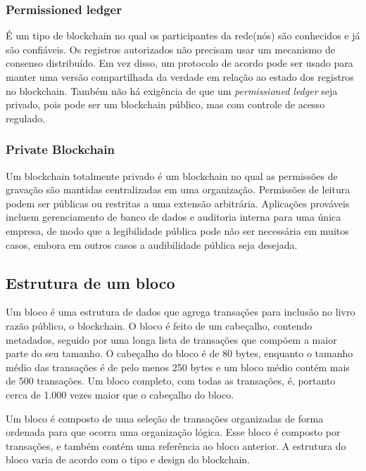     \subsubsection{Permissioned ledger}
    
    É um tipo de blockchain no qual os participantes da rede(nós) são conhecidos e já são confiáveis. Os registros autorizados não precisam usar um mecanismo de consenso distribuído. Em vez disso, um protocolo de acordo pode ser usado para manter uma versão compartilhada da verdade em relação ao estado dos registros no blockchain. Também não há exigência de que um \textit{permissioned ledger} seja privado, pois pode ser um blockchain público, mas com controle de acesso regulado.\cite{mastering_blockchain}

    \subsubsection{Private Blockchain}

    Um blockchain totalmente privado é um blockchain no qual as permissões de gravação são mantidas centralizadas em uma organização. Permissões de leitura podem ser públicas ou restritas a uma extensão arbitrária. Aplicações prováveis incluem gerenciamento de banco de dados e auditoria interna para uma única empresa, de modo que a legibilidade pública pode não ser necessária em muitos casos, embora em outros casos a audibilidade pública seja desejada.\cite{blockchain_pratical_guide}



    \subsection{Estrutura de um bloco}

        Um bloco é uma estrutura de dados que agrega transações para inclusão no livro razão público, o blockchain. O bloco é feito de um cabeçalho, contendo metadados, seguido por uma longa lista de transações que compõem a maior parte do seu tamanho. O cabeçalho do bloco é de 80 bytes, enquanto o tamanho médio das transações é de pelo menos 250 bytes e um bloco médio contém mais de 500 transações. Um bloco completo, com todas as transações, é, portanto cerca de 1.000 vezes maior que o cabeçalho do bloco.\cite{mastering_blockchain_andreas}

        Um bloco é composto de uma seleção de transações organizadas de forma ordenada para que ocorra uma organização lógica. Esse bloco é composto por transações, e também contém uma referência ao bloco anterior. A estrutura do bloco varia de acordo com o tipo e design do blockchain.\cite{mastering_blockchain}
        
